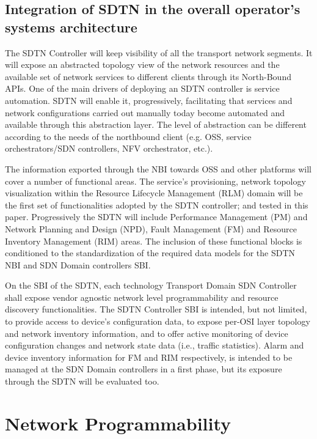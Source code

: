 \documentclass[a4paper,fleqn]{cas-dc}
\begin{document}
\subsection{Integration of SDTN in the overall operator’s systems architecture}
\label{section:sdtn}
The SDTN Controller will keep visibility of all the transport network segments. It will expose an abstracted topology view of the network resources and the available set of network services to different clients through its North-Bound APIs.  
One of the main drivers of deploying an SDTN controller is service automation. SDTN will enable it, progressively, facilitating that services and network configurations carried out manually today become automated and available through this abstraction layer.  The level of abstraction can be different according to the needs of the northbound client (e.g. OSS, service orchestrators/SDN controllers, NFV orchestrator, etc.). 

The information exported through the NBI towards OSS and other platforms will cover a number of functional areas. The service’s provisioning, network topology visualization within the Resource Lifecycle Management (RLM) domain will be the first set of functionalities adopted by the SDTN controller; and tested in this paper. Progressively the SDTN will include Performance Management (PM) and Network Planning and Design (NPD), Fault Management (FM) and Resource Inventory Management (RIM) areas. The inclusion of these functional blocks is conditioned to the standardization of the required data models for the SDTN NBI and SDN Domain controllers SBI.

On the SBI of the SDTN, each technology Transport Domain SDN Controller shall expose vendor agnostic network level programmability and resource discovery functionalities. The SDTN Controller SBI is intended, but not limited, to provide access to device’s configuration data, to expose per-OSI layer topology and network inventory information, and to offer active monitoring of device configuration changes and network state data (i.e., traffic statistics). Alarm and device inventory information for FM and RIM respectively, is intended to be managed at the SDN Domain controllers in a first phase, but its exposure through the SDTN will be evaluated too.


\section{Network Programmability}
\label{section:net}
\end{document}
